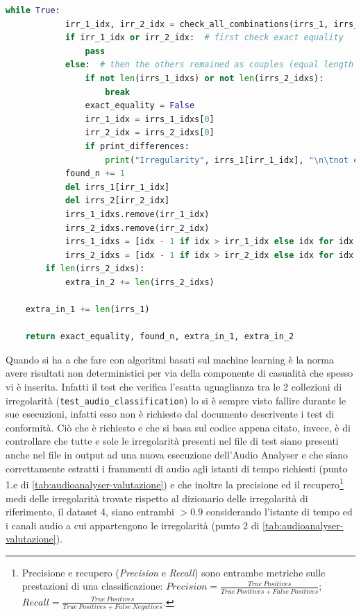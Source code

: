 \begin{lstlisting}[language=Python]
        while True:
            irr_1_idx, irr_2_idx = check_all_combinations(irrs_1, irrs_1_idxs, irrs_2, irrs_2_idxs)
            if irr_1_idx or irr_2_idx:  # first check exact equality
                pass
            else:  # then the others remained as couples (equal length already checked)
                if not len(irrs_1_idxs) or not len(irrs_2_idxs):
                    break
                exact_equality = False
                irr_1_idx = irrs_1_idxs[0]
                irr_2_idx = irrs_2_idxs[0]
                if print_differences:
                    print("Irregularity", irrs_1[irr_1_idx], "\n\tnot exactly equal to\n\t", irrs_2[irr_2_idx])
            found_n += 1
            del irrs_1[irr_1_idx]
            del irrs_2[irr_2_idx]
            irrs_1_idxs.remove(irr_1_idx)
            irrs_2_idxs.remove(irr_2_idx)
            irrs_1_idxs = [idx - 1 if idx > irr_1_idx else idx for idx in irrs_1_idxs]
            irrs_2_idxs = [idx - 1 if idx > irr_2_idx else idx for idx in irrs_2_idxs]
        if len(irrs_2_idxs):
            extra_in_2 += len(irrs_2_idxs)

    extra_in_1 += len(irrs_1)

    return exact_equality, found_n, extra_in_1, extra_in_2
\end{lstlisting}

Quando si ha a che fare con algoritmi basati sul machine learning è la norma avere risultati non deterministici per via della componente di casualità che spesso vi è inserita.
Infatti il test che verifica l'esatta uguaglianza tra le 2 collezioni di irregolarità (\verb|test_audio_classification|) lo si è sempre visto fallire durante le sue esecuzioni, infatti esso non è richiesto dal documento descrivente i test di conformità.
Ciò che è richiesto e che si basa sul codice appena citato, invece, è di controllare che tutte e sole le irregolarità presenti nel file di test siano presenti anche nel file in output ad una nuova esecuzione dell'Audio Analyser e che siano correttamente estratti i frammenti di audio agli istanti di tempo richiesti (punto 1.e di \ref{tab:audioanalyser-valutazione}) e che inoltre la precisione ed il recupero\footnote{Precisione e recupero (\textit{Precision} e \textit{Recall}) sono entrambe metriche sulle prestazioni di una classificazione: $Precision=\frac{True\ Positives}{True\ Positives + False\ Positives}$; $Recall=\frac{True\ Positives}{True\ Positives + False\ Negatives}$.} medi delle irregolarità trovate rispetto al dizionario delle irregolarità di riferimento, il dataset 4, siano entrambi $>0.9$ considerando l'istante di tempo ed i canali audio a cui appartengono le irregolarità (punto 2 di \ref{tab:audioanalyser-valutazione}).


